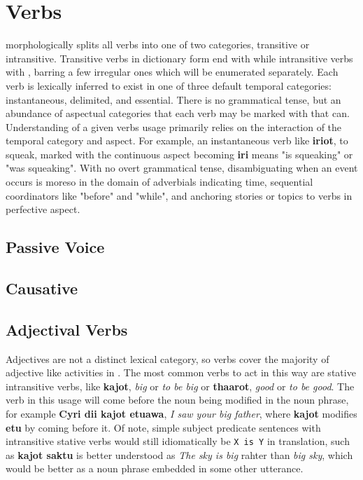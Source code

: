 \section{Verbs}
\langname morphologically splits all verbs into one of two categories, transitive or intransitive. Transitive verbs in dictionary form end with \suffixtext{\transv} while intransitive verbs with \suffixtext{\intransv}, barring a few irregular ones which will be enumerated separately. Each verb is lexically inferred to exist in one of three default temporal categories: instantaneous, delimited, and essential. There is no grammatical tense, but an abundance of aspectual categories that each verb may be marked with that can. Understanding of a given verbs usage primarily relies on the interaction of the temporal category and aspect. For example, an instantaneous verb like \textbf{iriot}, to squeak, marked with the continuous aspect becoming \textbf{iri\cont} means "is squeaking" or "was squeaking". With no overt grammatical tense, disambiguating when an event occurs is moreso in the domain of adverbials indicating time, sequential coordinators like "before" and "while", and anchoring stories or topics to verbs in perfective aspect.


\subsection{Passive Voice}

\subsection{Causative}


\subsection{Adjectival Verbs}
Adjectives are not a distinct lexical category, so verbs cover the majority of adjective like activities in \langname. The most common verbs to act in this way are stative intransitive verbs, like \textbf{kajot}, \textit{big} or \textit{to be big} or \textbf{thaarot}, \textit{good} or \textit{to be good}. The verb in this usage will come before the noun being modified in the noun phrase, for example \textbf{Cyri dii kajot etu\acc\space awa\gen}, \textit{I saw your big father}, where \textbf{kajot} modifies \textbf{etu} by coming before it. Of note, simple subject predicate sentences with intransitive stative verbs would still idiomatically be \texttt{X is Y} in translation, such as \textbf{kajot saktu} is better understood as \textit{The sky is big} rahter than \textit{big sky}, which would be better as a noun phrase embedded in some other utterance.

